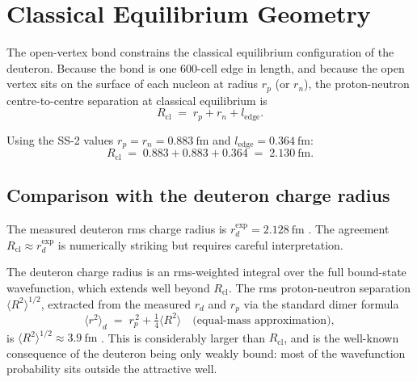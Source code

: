 \documentclass[11pt,letterpaper]{article}
\newcommand{\ledge}{l_{\mathrm{edge}}}
\newcommand{\rp}{r_{p}}
\newcommand{\rn}{r_{n}}
\begin{document}
\section{Classical Equilibrium Geometry}
\label{sec:geometry}

The open-vertex bond constrains the classical equilibrium configuration of the deuteron. Because the bond is one 600-cell edge in length, and because the open vertex sits on the surface of each nucleon at radius $\rp$ (or $\rn$), the proton-neutron centre-to-centre separation at classical equilibrium is
\begin{equation}
R_{\mathrm{cl}} \;=\; \rp + \rn + \ledge.
\label{eq:Rcl}
\end{equation}

Using the SS-2 values $\rp = \rn = 0.883~\mathrm{fm}$ and $\ledge = 0.364~\mathrm{fm}$:
\begin{equation}
R_{\mathrm{cl}} \;=\; 0.883 + 0.883 + 0.364 \;=\; 2.130~\mathrm{fm}.
\label{eq:Rcl_num}
\end{equation}

\subsection{Comparison with the deuteron charge radius}

The measured deuteron rms charge radius is $r_d^{\mathrm{exp}} = 2.128~\mathrm{fm}$ \citep{pohl2016}. The agreement $R_{\mathrm{cl}} \approx r_d^{\mathrm{exp}}$ is numerically striking but requires careful interpretation.

The deuteron charge radius is an rms-weighted integral over the full bound-state wavefunction, which extends well beyond $R_{\mathrm{cl}}$. The rms proton-neutron separation $\langle R^2 \rangle^{1/2}$, extracted from the measured $r_d$ and $\rp$ via the standard dimer formula
\begin{equation}
\langle r^2 \rangle_d \;=\; \rp^{\,2} + \tfrac{1}{4}\langle R^2 \rangle
\quad\text{(equal-mass approximation)},
\label{eq:dimer}
\end{equation}
is $\langle R^2 \rangle^{1/2} \approx 3.9~\mathrm{fm}$ \citep{krane_nuclear}. This is considerably larger than $R_{\mathrm{cl}}$, and is the well-known consequence of the deuteron being only weakly bound: most of the wavefunction probability sits outside the attractive well.
\end{document}
